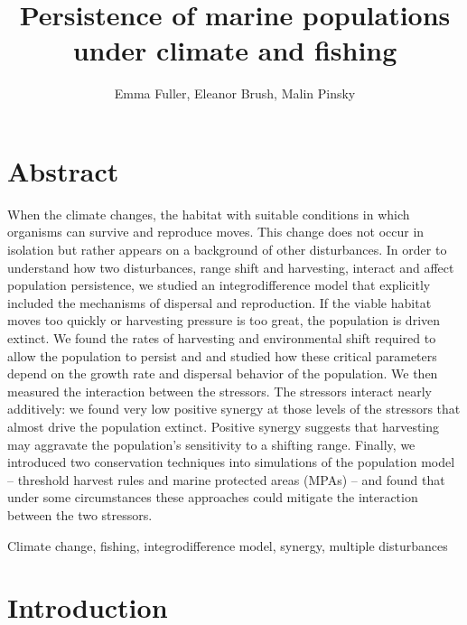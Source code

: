 \documentclass[12pt,english]{article}
\title{Persistence of marine populations under climate and fishing}
\author{Emma Fuller, Eleanor Brush, Malin Pinsky}
\date{}
\begin{document}
\maketitle

\begin{spacing}{1.9}
\begin{flushleft}

\section{Abstract}

When the climate changes, the habitat with suitable conditions in which organisms can survive and reproduce moves. 
This change does not occur in isolation but rather appears on a background of other disturbances. 
In order to understand how two disturbances, range shift and harvesting, interact and affect population persistence, we studied an integrodifference model that explicitly included the mechanisms of dispersal and reproduction.  If the viable habitat moves too quickly or harvesting pressure is too great, the population is driven extinct.  We found the rates of harvesting and environmental shift required to allow the population to persist and and studied how these critical parameters depend on the growth rate and dispersal behavior of the population.  We then measured the interaction between the stressors.  The stressors interact nearly additively: we found very low positive synergy at those levels of the stressors that almost drive the population extinct.  Positive synergy suggests that harvesting may aggravate the population's sensitivity to a shifting range. Finally, we introduced two conservation techniques into simulations of the population model -- threshold harvest rules and marine protected areas (MPAs) -- and found that under some circumstances these approaches could mitigate the interaction between the two stressors.  
\hspace{10cm}

 Climate change, fishing, integrodifference model, synergy, multiple disturbances

\section{Introduction}


\end{flushleft}
\end{spacing}
\end{document}

